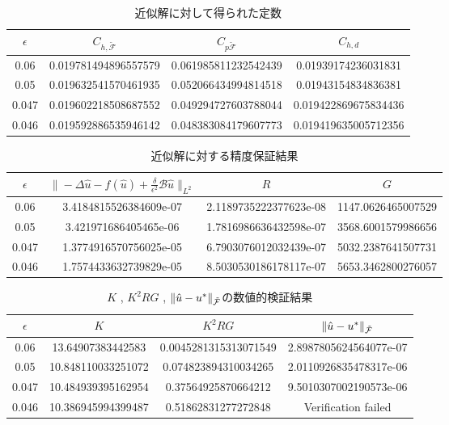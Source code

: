 \begin{table}[htbp]
  \centering
  \caption{近似解に対して得られた定数}\label{hyou:定数}
  \begin{tabular}{|c|c c c|}
   \hline
   \(\epsilon\) & \(C_{h,\tilde{\mathcal{F}}}\) & \(C_{p\tilde{\mathcal{F}}}\) & \(C_{h,d}\) \\ \hline
   0.06 & 0.019781494896557579 & 0.061985811232542439 & 0.01939174236031831 \\
   0.05 & 0.019632541570461935 & 0.052066434994814518 & 0.01943154834836381 \\
   0.047 & 0.019602218508687552& 0.049294727603788044 & 0.019422869675834436 \\
   0.046 & 0.019592886535946142 & 0.048383084179607773 & 0.019419635005712356 \\\hline
  \end{tabular}
\end{table}

\begin{table}[htbp]
  \centering
  \caption{近似解に対する精度保証結果}\label{hyou:精度保証結果}
  \begin{tabular}{|c|c c c|}
   \hline
   \(\epsilon\) & \(\|-\Delta \hat{u}-f(\hat{u})+\frac{\delta}{\epsilon^2}\mathcal{B}\hat{u}\|_{L^2}\) & \(R\) & \(G\) \\ \hline
   0.06 & 3.4184815526384609e-07 & 2.1189735222377623e-08 & 1147.0626465007529 \\
   0.05 & 3.421971686405465e-06 & 1.7816986636432598e-07 & 3568.6001579986656 \\
   0.047 & 1.3774916570756025e-05 & 6.7903076012032439e-07 & 5032.2387641507731 \\
   0.046 & 1.7574433632739829e-05 & 8.5030530186178117e-07 & 5653.3462800276057 \\\hline
  \end{tabular}
\end{table}

\begin{table}[htbp]
  \centering
  \caption{\(K\) , \(K^2RG\) , \(\norm{\hat{u}-u^*}_{\tilde{\mathcal{F}}}\)の数値的検証結果}\label{hyou:数値的検証結果}
  \begin{tabular}{|c|c c c|}
   \hline
   \(\epsilon\) & \(K\) & \(K^2RG\) & \(\norm{\hat{u}-u^*}_{\tilde{\mathcal{F}}}\) \\ \hline
   0.06 & 13.64907383442583 & 0.0045281315313071549 & 2.8987805624564077e-07 \\
   0.05 & 10.848110033251072 &0.074823894310034265 & 2.0110926835478317e-06\\
   0.047 & 10.484939395162954 & 0.37564925870664212 & 9.5010307002190573e-06 \\
   0.046 & 10.386945994399487 & 0.51862831277272848 & Verification failed \\\hline
  \end{tabular}
\end{table}
